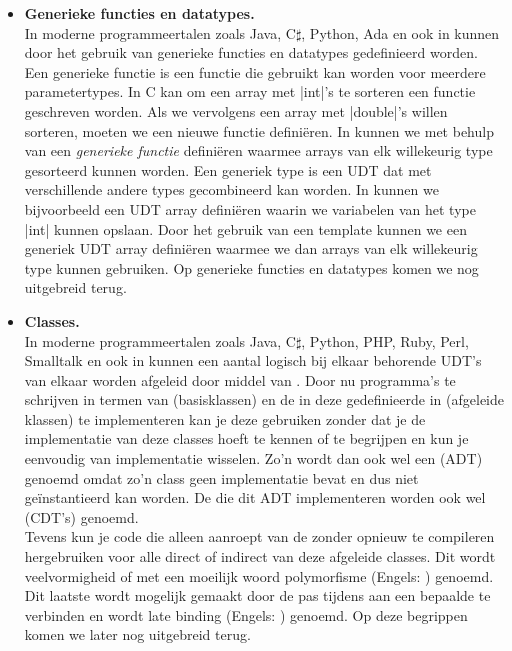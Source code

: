 \begin{cpplstShortInline}
\begin{itemize}
Dit is dus weer een vorm van .
Op het begrip UDT komen we nog uitgebreid terug.
    \item \textbf{Generieke functies en datatypes.}\\
In moderne programmeertalen zoals Java, C$\sharp$, Python, Ada en ook in \Cpp{} kunnen door het gebruik van \emph{} generieke functies en datatypes gedefinieerd worden.
Een generieke functie is een functie die gebruikt kan worden voor meerdere parametertypes.
In C kan om een array met |int|'s te sorteren een functie geschreven worden.
Als we vervolgens een array met |double|'s willen sorteren, moeten we een nieuwe functie definiëren.
In \Cpp{} kunnen we met behulp van  een \emph{generieke functie} definiëren waarmee arrays van elk willekeurig type gesorteerd kunnen worden.
Een generiek type is een UDT dat met verschillende andere types gecombineerd kan worden.
In \Cpp{} kunnen we bijvoorbeeld een UDT array definiëren waarin we variabelen van het type |int| kunnen opslaan.
Door het gebruik van een template kunnen we een generiek UDT array definiëren waarmee we dan arrays van elk willekeurig type kunnen gebruiken.
Op generieke functies en datatypes komen we nog uitgebreid terug.
    \item \textbf{Classes.}\\
In moderne programmeertalen zoals Java, C$\sharp$, Python, PHP, Ruby, Perl, Smalltalk en ook in \Cpp{} kunnen een aantal logisch bij elkaar behorende UDT's van elkaar worden afgeleid door middel van .
Door nu programma's te schrijven in termen van  (basisklassen) en de in deze  gedefinieerde  in  (afgeleide klassen) te implementeren kan je deze  gebruiken zonder dat je de implementatie van deze classes hoeft te kennen of te begrijpen en kun je eenvoudig van implementatie wisselen.
Zo'n  wordt dan ook wel een  (ADT) genoemd omdat zo'n class geen implementatie bevat en dus niet geïnstantieerd kan worden. 
De  die dit ADT implementeren worden ook wel   (CDT's) genoemd.\\
Tevens kun je code die alleen  aanroept van de  zonder opnieuw te compileren hergebruiken voor alle direct of indirect van deze  afgeleide classes. Dit wordt veelvormigheid of met een moeilijk woord polymorfisme (Engels: \emph{}) genoemd.
Dit laatste wordt mogelijk gemaakt door de  pas tijdens  aan een bepaalde  te verbinden en wordt late binding (Engels: \emph{}) genoemd.
Op deze begrippen komen we later nog uitgebreid terug.
\end{itemize}


\end{cpplstShortInline}
